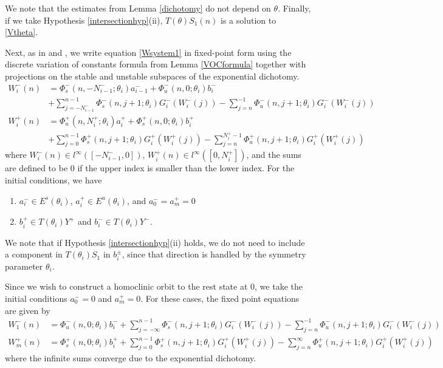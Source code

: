 \documentclass[12pt]{article}
\begin{document}
We note that the estimates from Lemma \ref{dichotomy} do not depend on $\theta$. Finally, if we take Hypothesis \ref{intersectionhyp}(ii), $T(\theta) S_1(n)$ is a solution to \eqref{Vtheta}.

Next, as in \cite{Sandstede1997} and \cite{Knobloch2000}, we write equation \eqref{Wsystem1} in fixed-point form using the discrete variation of constants formula from Lemma \ref{VOCformula} together with projections on the stable and unstable subspaces of the exponential dichotomy.
\begin{equation}\label{FPeqs1}
\begin{aligned}
W_i^-(n) &= 
\Phi_s^-(n, -N_{i-1}^-; \theta_i) a_{i-1}^- + \Phi_u^-(n, 0; \theta_i) b_i^-  \\
&+ \sum_{j = -N_{i-1}^-}^{n-1} \Phi_s^-(n, j+1; \theta_i) G_i^-(W_i^-(j)) - \sum_{j = n}^{-1} \Phi_u^-(n, j+1; \theta_i) G_i^-(W_i^-(j)) \\
W_i^+(n) &= \Phi_u^+(n, N_i^+; \theta_i) a_i^+ + \Phi_s^+(n, 0; \theta_i) b_i^+ \\
&+ \sum_{j = 0}^{n-1} \Phi_s^+(n, j+1; \theta_i) G_i^+(W_i^+(j)) 
- \sum_{j = n}^{N_i^+-1} \Phi_u^+(n, j+1; \theta_i) G_i^+(W_i^+(j))
\end{aligned}
\end{equation}
where $W_i^-(n) \in l^\infty([-N_{i-1}^-, 0])$, $W_i^+(n) \in l^\infty([0, N_i^+])$, and the sums are defined to be $0$ if the upper index is smaller than the lower index. For the initial conditions, we have
\begin{enumerate}
\item $a_i^- \in E^s(\theta_i)$, $a_i^+ \in E^u(\theta_i)$, and $a_0^- = a_m^+ = 0$
\item $b_i^+ \in T(\theta_i) Y^+$ and $b_i^- \in T(\theta_i) Y^-$.
\end{enumerate}
We note that if Hypothesis \ref{intersectionhyp}(ii) holds, we do not need to include a component in $T(\theta_i) S_1$ in $b_i^\pm$, since that direction is handled by the symmetry parameter $\theta_i$.

Since we wish to construct a homoclinic orbit to the rest state at 0, we take the initial conditions $a_0^- = 0$ and $a_m^+ = 0$. For these cases, the fixed point equations are given by
\begin{align*}
W_1^-(n) &= \Phi_u^-(n, 0; \theta_i) b_i^- 
+ \sum_{j = -\infty}^{n-1} \Phi_s^-(n, j+1; \theta_i) G_i^-(W_i^-(j)) - \sum_{j = n}^{-1} \Phi_u^-(n, j+1; \theta_i) G_i^-(W_i^-(j)) \\
W_m^+(n) &= \Phi_s^+(n, 0; \theta_i) b_i^+ 
+ \sum_{j = 0}^{n-1} \Phi_s^+(n, j+1; \theta_i) G_i^+(W_i^+(j)) 
- \sum_{j = n}^\infty \Phi_u^+(n, j+1; \theta_i) G_i^+(W_i^+(j))
\end{align*}
where the infinite sums converge due to the exponential dichotomy. 
\end{document}
